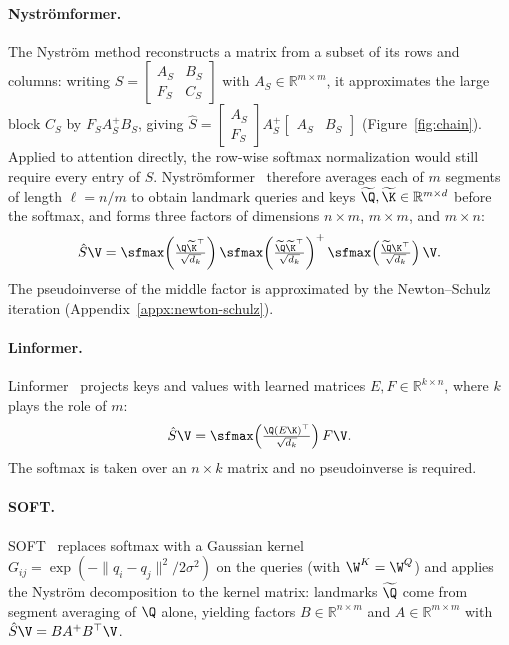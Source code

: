 \documentclass[runningheads]{llncs}
\begin{document}
\paragraph{Nystr\"omformer.}
The Nystr\"om method reconstructs a matrix from a subset of its rows and columns: writing $S = \begin{bmatrix} A_S & B_S \\ F_S & C_S \end{bmatrix}$ with $A_S \in \mathbb{R}^{m \times m}$, it approximates the large block $C_S$ by $F_S A_S^{+} B_S$, giving $\hat S = \begin{bmatrix} A_S \\ F_S \end{bmatrix} A_S^{+} \begin{bmatrix} A_S & B_S \end{bmatrix}$ (Figure~\ref{fig:chain}). Applied to attention directly, the row-wise softmax normalization would still require every entry of $S$. Nystr\"omformer~\cite{Nystromformer} therefore averages each of $m$ segments of length $\ell = n/m$ to obtain landmark queries and keys $\widetilde{\Q}, \widetilde{\K} \in \mathbb{R}^{m \times d}$ before the softmax, and forms three factors of dimensions $n \times m$, $m \times m$, and $m \times n$:
\[
\hat S \V =
\sfmax\!\left(\tfrac{\Q\widetilde{\K}^{\top}}{\sqrt{d_k}}\right)
\sfmax\!\left(\tfrac{\widetilde{\Q}\widetilde{\K}^{\top}}{\sqrt{d_k}}\right)^{+}
\sfmax\!\left(\tfrac{\widetilde{\Q}\K^{\top}}{\sqrt{d_k}}\right)\V .
\]
The pseudoinverse of the middle factor is approximated by the Newton--Schulz iteration (Appendix~\ref{appx:newton-schulz}).

\paragraph{Linformer.}
Linformer~\cite{Linformer} projects keys and values with learned matrices $E, F \in \mathbb{R}^{k \times n}$, where $k$ plays the role of $m$:
\[
\hat S \V = \sfmax\!\left(\tfrac{\Q(E\K)^{\top}}{\sqrt{d_k}}\right) F\V .
\]
The softmax is taken over an $n \times k$ matrix and no pseudoinverse is required.

\paragraph{SOFT.}
SOFT~\cite{SOFT} replaces softmax with a Gaussian kernel $G_{ij} = \exp(-\|q_i - q_j\|^2 / 2\sigma^2)$ on the queries (with $\W^K = \W^Q$) and applies the Nystr\"om decomposition to the kernel matrix: landmarks $\widetilde{\Q}$ come from segment averaging of $\Q$ alone, yielding factors $B \in \mathbb{R}^{n \times m}$ and $A \in \mathbb{R}^{m \times m}$ with $\hat S \V = B A^{+} B^{\top} \V$.
\end{document}
